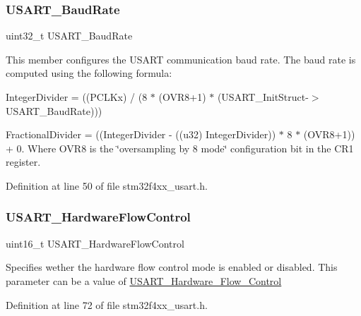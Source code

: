 \subsubsection{\texorpdfstring{U\+S\+A\+R\+T\+\_\+\+Baud\+Rate}{USART\_BaudRate}}
{\footnotesize\ttfamily uint32\+\_\+t U\+S\+A\+R\+T\+\_\+\+Baud\+Rate}

This member configures the U\+S\+A\+RT communication baud rate. The baud rate is computed using the following formula\+:
\begin{DoxyItemize}
\item Integer\+Divider = ((P\+C\+L\+Kx) / (8 $\ast$ (O\+V\+R8+1) $\ast$ (U\+S\+A\+R\+T\+\_\+\+Init\+Struct-\/$>$U\+S\+A\+R\+T\+\_\+\+Baud\+Rate)))
\item Fractional\+Divider = ((Integer\+Divider -\/ ((u32) Integer\+Divider)) $\ast$ 8 $\ast$ (O\+V\+R8+1)) + 0. Where O\+V\+R8 is the \char`\"{}oversampling by 8 mode\char`\"{} configuration bit in the C\+R1 register. 
\end{DoxyItemize}

Definition at line 50 of file stm32f4xx\+\_\+usart.\+h.

\mbox{\label{struct_u_s_a_r_t___init_type_def_ab41fe3b9f5cb4ed89be23bff0a1f4114}} 
\subsubsection{\texorpdfstring{U\+S\+A\+R\+T\+\_\+\+Hardware\+Flow\+Control}{USART\_HardwareFlowControl}}
{\footnotesize\ttfamily uint16\+\_\+t U\+S\+A\+R\+T\+\_\+\+Hardware\+Flow\+Control}

Specifies wether the hardware flow control mode is enabled or disabled. This parameter can be a value of \hyperlink{group___u_s_a_r_t___hardware___flow___control}{U\+S\+A\+R\+T\+\_\+\+Hardware\+\_\+\+Flow\+\_\+\+Control} 

Definition at line 72 of file stm32f4xx\+\_\+usart.\+h.

\mbox{\label{struct_u_s_a_r_t___init_type_def_a1a581f24451bf5a4a210bab8d68998e2}} 
